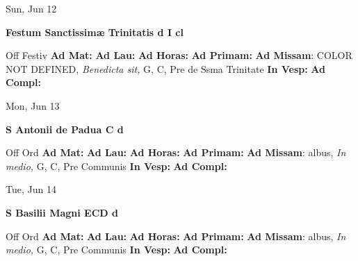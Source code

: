 \documentclass[10pt]{memoir}
\begin{document}
\begin{center}
\begin{minipage}{3.5in}
\vspace{2em}
\begin{center}Sun, Jun 12
\end{center}
\textbf{ \large Festum Sanctissimæ Trinitatis
\textnormal{\normalsize d I cl}}

\begin{justify}Off Festiv
\textbf{Ad Mat: }
\textbf{Ad Lau: }
\textbf{Ad Horas: }
\textbf{Ad Primam: }\textbf{Ad Missam}: COLOR NOT DEFINED, \textit{Benedicta sit,} G, C, Pre de Ssma Trinitate
\textbf{In Vesp: }
\textbf{Ad Compl: }
\end{justify}
\end{minipage}
\end{center}

\begin{center}
\begin{minipage}{3.5in}
\vspace{2em}
\begin{center}Mon, Jun 13
\end{center}
\textbf{ \large S Antonii de Padua C
\textnormal{\normalsize d}}

\begin{justify}Off Ord
\textbf{Ad Mat: }
\textbf{Ad Lau: }
\textbf{Ad Horas: }
\textbf{Ad Primam: }\textbf{Ad Missam}: albus, \textit{In medio,} G, C, Pre Communis
\textbf{In Vesp: }
\textbf{Ad Compl: }
\end{justify}
\end{minipage}
\end{center}

\begin{center}
\begin{minipage}{3.5in}
\vspace{2em}
\begin{center}Tue, Jun 14
\end{center}
\textbf{ \large S Basilii Magni ECD
\textnormal{\normalsize d}}

\begin{justify}Off Ord
\textbf{Ad Mat: }
\textbf{Ad Lau: }
\textbf{Ad Horas: }
\textbf{Ad Primam: }\textbf{Ad Missam}: albus, \textit{In medio,} G, C, Pre Communis
\textbf{In Vesp: }
\textbf{Ad Compl: }
\end{justify}
\end{minipage}
\end{center}
\end{document}
